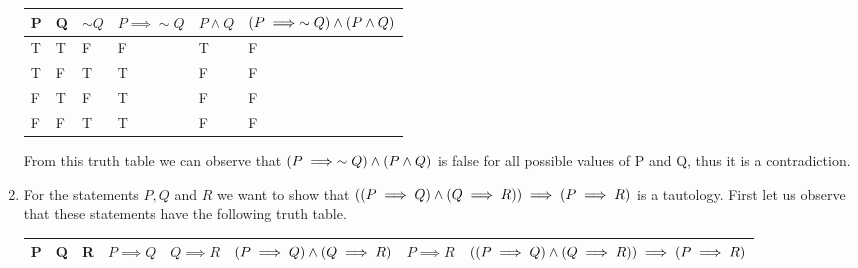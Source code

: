 \documentclass[12pt]{article}
\makeatletter
\newcommand*{\arabicodd}[1]{%
  \expandafter\@arabicodd\csname c@#1\endcsname
}
\newcommand*{\@arabicodd}[1]{%
  \@arabic{\numexpr(#1)*2-1\relax}%
}
\makeatother
\begin{document}
\begin{enumerate}[label=2.\arabicodd*, start=24]
        \hfill
        \hfill
        \linebreak
        \linebreak
        \begin{minipage}{\linewidth}
          \begin{tabular}{@{}llllll@{}}
            \toprule
            P & Q & $\sim Q$ & $P \implies \sim Q$ & $P \land Q$ & $\qty(P \implies \sim Q) \land \qty(P \land Q)$ \\ \midrule
            T & T & F        & F                   & T           & F                                               \\
            T & F & T        & T                   & F           & F                                               \\
            F & T & F        & T                   & F           & F                                               \\
            F & F & T        & T                   & F           & F                                               \\ \bottomrule
          \end{tabular}
        \end{minipage}
        \linebreak
        \linebreak
        From this truth table we can observe that $\qty(P \implies \sim Q) \land \qty(P \land Q)$ is
        false for all possible values of P and Q, thus it is a contradiction.
  \item
        For the statements $P, Q$ and $R$ we want to show that $\qty(\qty(P \implies Q) \land \qty(Q \implies R)) \implies \qty(P \implies R)$
        is a tautology. First let us observe that these statements have the following
        truth table.
        \hfill
        \hfill
        \hfill
        \linebreak
        \linebreak
        \begin{minipage}{\linewidth}
          \begin{sidewaystable}
            \begin{tabular}{@{}llllllll@{}}
              \toprule
              P & Q & R & $P \implies Q$ & $Q \implies R$ & $\qty(P \implies Q) \land \qty(Q \implies R)$ & $P \implies R$ & $\qty(\qty(P \implies Q) \land \qty(Q \implies R)) \implies \qty(P \implies R)$ \\ \midrule

\end{tabular}
\end{sidewaystable}
\end{minipage}
\end{enumerate}
\end{document}
